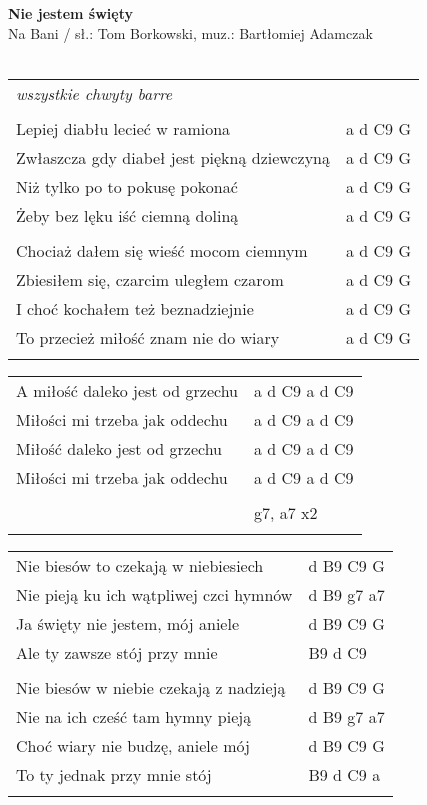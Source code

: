 \documentclass[a5paper]{article}
\begin{document}


\noindent
\fontsize{12pt}{15pt}\selectfont
\textbf{Nie jestem święty} \\
\fontsize{8pt}{10pt}\selectfont
Na Bani / sł.: Tom Borkowski, muz.: Bartłomiej Adamczak\\ \\
\fontsize{10pt}{12pt}\selectfont
{}
\begin{tabular}{@{}p{8.00cm}p{3cm}@{}}
\noindent
\emph{wszystkie chwyty barre} \\ \\

Lepiej diabłu lecieć w ramiona & a d C9 G \\
Zwłaszcza gdy diabeł jest piękną dziewczyną & a d C9 G \\
Niż tylko po to pokusę pokonać & a d C9 G \\
Żeby bez lęku iść ciemną doliną & a d C9 G \\ \\

Chociaż dałem się wieść mocom ciemnym & a d C9 G \\
Zbiesiłem się, czarcim uległem czarom & a d C9 G \\
I choć kochałem też beznadziejnie & a d C9 G \\
To przecież miłość znam nie do wiary & a d C9 G \\ \\
\end{tabular}

\noindent
\begin{tabular}{@{}p{6.00cm}p{3cm}@{}}
A miłość daleko jest od grzechu & a d C9 a d C9 \\
Miłości mi trzeba jak oddechu & a d C9 a d C9 \\
Miłość daleko jest od grzechu & a d C9 a d C9 \\
Miłości mi trzeba jak oddechu & a d C9 a d C9 \\ \\
& g7, a7 x2 \\ \\
\end{tabular}

\noindent
\begin{tabular}{@{}p{7.00cm}p{3cm}@{}}
Nie biesów to czekają w niebiesiech & d B9 C9 G \\
Nie pieją ku ich wątpliwej czci hymnów & d B9 g7 a7 \\
Ja święty nie jestem, mój aniele & d B9 C9 G \\
Ale ty zawsze stój przy mnie & B9 d C9 \\ \\

Nie biesów w niebie czekają z nadzieją & d B9 C9 G \\
Nie na ich cześć tam hymny pieją & d B9 g7 a7 \\
Choć wiary nie budzę, aniele mój & d B9 C9 G \\
To ty jednak przy mnie stój	& B9 d C9 a \\ \\
\end{tabular}
\end{document}
